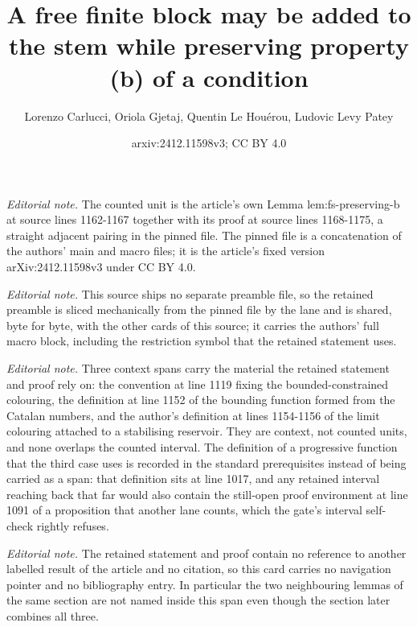 \documentclass{article}
\title{A free finite block may be added to the stem while preserving property (b) of a condition}
\author{Lorenzo Carlucci, Oriola Gjetaj, Quentin Le Houérou, Ludovic Levy Patey}
\date{arxiv:2412.11598v3; CC BY 4.0}
\numberwithin{theorem}{section}
\begin{document}
\maketitle
\noindent\textit{Editorial note.} The counted unit is the article's own Lemma lem:fs-preserving-b at source lines 1162-1167 together with its proof at source lines 1168-1175, a straight adjacent pairing in the pinned file. The pinned file is a concatenation of the authors' main and macro files; it is the article's fixed version arXiv:2412.11598v3 under CC BY 4.0.\par\medskip
\noindent\textit{Editorial note.} This source ships no separate preamble file, so the retained preamble is sliced mechanically from the pinned file by the lane and is shared, byte for byte, with the other cards of this source; it carries the authors' full macro block, including the restriction symbol that the retained statement uses.\par\medskip
\noindent\textit{Editorial note.} Three context spans carry the material the retained statement and proof rely on: the convention at line 1119 fixing the bounded-constrained colouring, the definition at line 1152 of the bounding function formed from the Catalan numbers, and the author's definition at lines 1154-1156 of the limit colouring attached to a stabilising reservoir. They are context, not counted units, and none overlaps the counted interval. The definition of a progressive function that the third case uses is recorded in the standard prerequisites instead of being carried as a span: that definition sits at line 1017, and any retained interval reaching back that far would also contain the still-open proof environment at line 1091 of a proposition that another lane counts, which the gate's interval self-check rightly refuses.\par\medskip
\noindent\textit{Editorial note.} The retained statement and proof contain no reference to another labelled result of the article and no citation, so this card carries no navigation pointer and no bibliography entry. In particular the two neighbouring lemmas of the same section are not named inside this span even though the section later combines all three.\par\medskip
\end{document}
